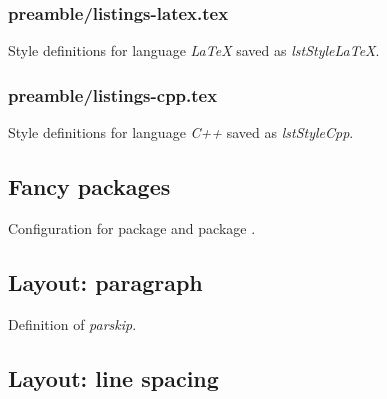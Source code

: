 
\subsubsection{preamble/listings-latex.tex}

Style definitions for language \emph{LaTeX} saved as \emph{lstStyleLaTeX}.


\subsubsection{preamble/listings-cpp.tex}

Style definitions for language \emph{C++} saved as \emph{lstStyleCpp}.



\subsection{Fancy packages}
\label{sec:style:fancy}

Configuration for package  and package .


\subsection{Layout: paragraph}
\label{sec:style:layout:paragraph}

Definition of \emph{parskip}.


\subsection{Layout: line spacing}
\label{sec:style:layout:linespacing}

